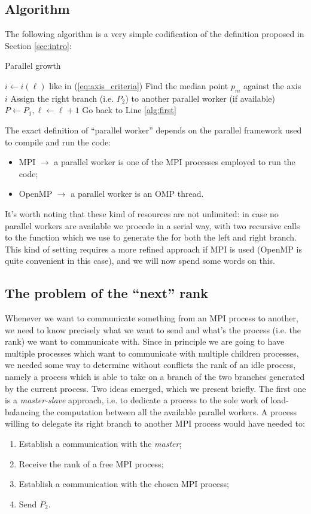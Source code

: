 \documentclass{article}
\begin{document}
\subsection{Algorithm}
The following algorithm is a very simple codification of the definition proposed in
Section \ref{sec:intro}:
\begin{algorithm}
    \SetAlgoLined
    \caption{Parallel \kdtree{} growth}\label{alg:parallel_algorithm}
    $i \gets i(\ell)$ like in (\ref{eq:axis_criteria})\; \label{alg:first}
    Find the median point $p_m$ against the axis $i$\;
    Assign the right branch (i.e. $P_2$) to another parallel worker (if available)\;
    $P \gets P_1, \ell \gets \ell + 1$\;
    Go back to Line \ref{alg:first}\;
\end{algorithm}

The exact definition of ``parallel worker'' depends on the parallel framework
used to compile and run the code:
\begin{itemize}
    \item MPI $\to$ a parallel worker is one of the MPI processes employed to run the code;
    \item OpenMP $\to$ a parallel worker is an OMP thread.
\end{itemize}

It's worth noting that these kind of resources are not unlimited: in case no
parallel workers are available we procede in a serial way, with two recursive
calls to the function which we use to generate the \kdtree{} for both the left
and right branch. This kind of setting requires a more refined approach if
MPI is used (OpenMP is quite convenient in this case), and we will now spend
some words on this.

\subsection{The problem of the ``next'' rank} \label{sec:next_rank}
Whenever we want to communicate something from an MPI process to another, we
need to know precisely what we want to send and what's the process
(i.e. the rank) we want to communicate with. Since in principle we are going to
have multiple processes which want to communicate with multiple children
processes, we needed some way to determine without conflicts the rank of an
idle process, namely a process which is able to take on a branch of the two
branches generated by the current process. Two ideas emerged, which we present
briefly. The first one is a \emph{master-slave}  approach, i.e. to dedicate a
process to the sole work of load-balancing the computation between all the
available parallel workers. A process willing to delegate its right branch to
another MPI process would have needed to:
\begin{enumerate}
    \item Establish a communication with the \emph{master};
    \item Receive the rank of a free MPI process;
    \item Establish a communication with the chosen MPI process;
    \item Send $P_2$.
\end{enumerate}
\end{document}
